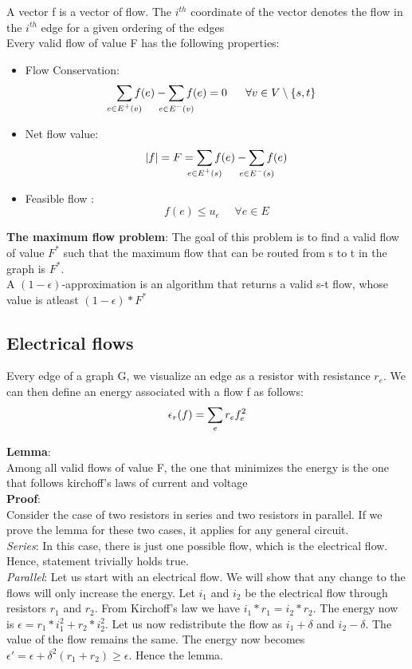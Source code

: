 \documentclass[a4paper,10pt]{article}
\newcommand{\eps}{\epsilon}
\begin{document}
    A vector f is a vector of flow. The $i^{th}$ coordinate of the vector denotes the flow in the $i^{th}$ edge for a given ordering of the 
    edges \\
    
    Every valid flow of value F has the following properties: 
    \begin{itemize}
    \item 
      Flow Conservation: $$\sum_{\mathclap{e \in E^+(v)}} f(e)- \sum_{\mathclap{e \in E^-(v)}} f(e) = 0 ~~~~~ \forall v \in V \setminus \{s,t\}$$
    \item
      Net flow value:
      $$|f| = F = \sum_{\mathclap{e \in E^+(s)}} f(e)- \sum_{\mathclap{e \in E^-(s)}} f(e)$$
    \item
      Feasible flow :
      $$f(e) \leq u_e ~~~~~~ \forall e \in E$$
    \end{itemize}
    
    \textbf{The maximum flow problem}: The goal of this problem is to find a valid flow of value $F^{\ast}$ such that the maximum flow that 
    can be routed from s to t in the graph is $F^{\ast}$. \\
    A $(1-\eps)$-approximation is an algorithm that returns a valid s-t flow, whose value
    is atleast $(1-\eps)\ast F^{\ast}$ 
    
    \subsection{Electrical flows}
      Every edge of a graph G, we visualize an edge as a resistor with resistance $r_e$. We can then define an energy associated with a flow f as
      follows: 
      $$\eps_r(f) = \sum_{\mathclap{e}}r_e f_{e}^{2}$$

      \textbf{Lemma}: \\
	Among all valid flows of value F, the one that minimizes the energy is the one that follows kirchoff's laws of current and voltage \\
	
      \textbf{Proof}: \\
	Consider the case of two resistors in series and two resistors in parallel. If we prove the lemma for these two cases, it applies for 
	any general circuit. \\
	
	\textit{Series}: In this case, there is just one possible flow, which is the electrical flow. Hence, statement trivially holds true. \\
	
	\textit{Parallel}:  Let us start with an electrical flow. We will show that any change to the flows will only increase the energy.
	Let $i_1$ and $i_2$ be the electrical flow through resistors $r_1$ and $r_2$. From Kirchoff's law we have $i_1 \ast r_1 = i_2 \ast r_2 $.
	The energy now is $\eps = r_1  \ast i_1^2 + r_2 \ast i_2^2$. Let us now redistribute the flow as $i_1 + \delta$ and $i_2 - \delta$. 
	The value of the flow remains the same. The energy now becomes $\eps' = \eps + \delta^2(r_1+r_2) \geq \eps$. Hence the lemma.
	
	
    
 
  
  
   
\end{document}
